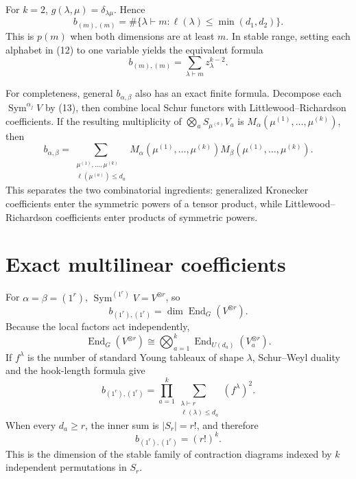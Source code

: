 \documentclass[11pt]{article}
\newcommand{\Sym}{\operatorname{Sym}}
\newcommand{\End}{\operatorname{End}}
\begin{document}
For $k=2$, $g(\lambda,\mu)=\delta_{\lambda\mu}$. Hence
\begin{equation}
 \boxed{b_{(m),(m)}=
 \#\{\lambda\vdash m:\ell(\lambda)\le\min(d_1,d_2)\}.}
\end{equation}
This is $p(m)$ when both dimensions are at least $m$. In stable range, setting
each alphabet in (12) to one variable yields the equivalent formula
\begin{equation}
 \boxed{b_{(m),(m)}=\sum_{\lambda\vdash m}z_\lambda^{k-2}.}
\end{equation}

For completeness, general $b_{\alpha,\beta}$ also has an exact finite formula.
Decompose each $\Sym^{\alpha_j}V$ by (13), then combine local Schur functors
with Littlewood--Richardson coefficients. If the resulting multiplicity of
$\bigotimes_aS_{\mu^{(a)}}V_a$ is $M_\alpha(\mu^{(1)},\ldots,\mu^{(k)})$,
then
\begin{equation}
 b_{\alpha,\beta}=\sum_{\substack{\mu^{(1)},\ldots,\mu^{(k)}\\
                          \ell(\mu^{(a)})\le d_a}}
 M_\alpha(\mu^{(1)},\ldots,\mu^{(k)})
 M_\beta(\mu^{(1)},\ldots,\mu^{(k)}).
\end{equation}
This separates the two combinatorial ingredients: generalized Kronecker
coefficients enter the symmetric powers of a tensor product, while
Littlewood--Richardson coefficients enter products of symmetric powers.

\section{Exact multilinear coefficients}

For $\alpha=\beta=(1^r)$, $\Sym^{(1^r)}V=V^{\otimes r}$, so
\begin{equation}
 b_{(1^r),(1^r)}=\dim\End_G(V^{\otimes r}).
\end{equation}
Because the local factors act independently,
\[
 \End_G(V^{\otimes r})\cong
 \bigotimes_{a=1}^k\End_{U(d_a)}(V_a^{\otimes r}).
\]
If $f^\lambda$ is the number of standard Young tableaux of shape $\lambda$,
Schur--Weyl duality and the hook-length formula give
\begin{equation}
 \boxed{b_{(1^r),(1^r)}=
 \prod_{a=1}^k\sum_{\substack{\lambda\vdash r\\
                    \ell(\lambda)\le d_a}}(f^\lambda)^2.}
\end{equation}
When every $d_a\ge r$, the inner sum is $|S_r|=r!$, and therefore
\begin{equation}
 \boxed{b_{(1^r),(1^r)}=(r!)^k.}
\end{equation}
This is the dimension of the stable family of contraction diagrams indexed by
$k$ independent permutations in $S_r$.
\end{document}
